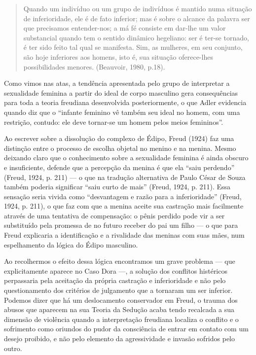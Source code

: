 \begin{quote}
Quando um indivíduo ou um grupo de indivíduos é mantido numa situação de
inferioridade, ele é de fato inferior; mas é sobre o alcance da palavra
ser que precisamos entender-nos; a má fé consiste em dar-lhe um valor
substancial quando tem o sentido dinâmico hegeliano: ser é ter-se
tornado, é ter sido feito tal qual se manifesta. Sim, as mulheres, em
seu conjunto, são hoje inferiores aos homens, isto é, sua situação
oferece-lhes possibilidades menores. (Beauvoir, 1980, p.18).
\end{quote}

Como vimos nas atas, a tendência apresentada pelo grupo de interpretar a
sexualidade feminina a partir do ideal de corpo masculino gera
consequências para toda a teoria freudiana desenvolvida posteriormente,
o que Adler evidencia quando diz que o ``infante feminino vê também seu
ideal no homem, com uma restrição, contudo: ele deve tornar-se um homem
pelos meios femininos''.

Ao escrever sobre a dissolução do complexo de Édipo, Freud (1924) faz
uma distinção entre o processo de escolha objetal no menino e na menina.
Mesmo deixando claro que o conhecimento sobre a sexualidade feminina é
ainda obscuro e insuficiente, defende que a percepção da menina é que
ela ``saiu perdendo'' (Freud, 1924, p. 211) --- o que na tradução
alternativa de Paulo César de Souza também poderia significar ``saiu
curto de mais'' (Freud, 1924, p. 211). Essa sensação seria vivida como
``desvantagem e razão para a inferioridade'' (Freud, 1924, p. 211), o que
faz com que a menina aceite sua castração mais facilmente através de uma
tentativa de compensação: o pênis perdido pode vir a ser substituído
pela promessa de no futuro receber do pai um filho --- o que para Freud
explicaria a identificação e a rivalidade das meninas com suas mães, num
espelhamento da lógica do Édipo masculino.

Ao recolhermos o efeito dessa lógica encontramos um grave problema ---
que explicitamente aparece no Caso Dora ---, a solução dos conflitos
histéricos perpassaria pela aceitação da própria castração e
inferioridade e não pelo questionamento dos critérios de julgamento que
a tornaram um ser inferior. Podemos dizer que há um deslocamento
conservador em Freud, o trauma dos abusos que aparecem na sua Teoria da
Sedução acaba tendo recalcada a sua dimensão de violência quando a
interpretação freudiana localiza o conflito e o sofrimento como oriundos
do pudor da consciência de entrar em contato com um desejo proibido, e
não pelo elemento da agressividade e invasão sofridos pelo outro.

